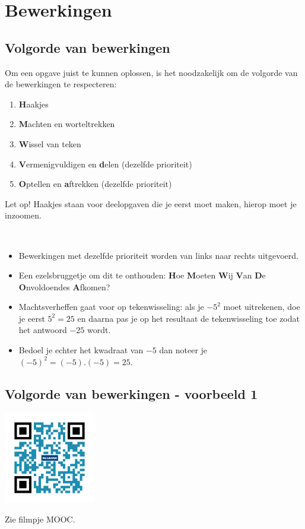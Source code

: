 \section{Bewerkingen}

\subsection{Volgorde van bewerkingen}
Om een opgave juist te kunnen oplossen, is het noodzakelijk om de volgorde van de bewerkingen te respecteren:

\begin{enumerate}
	\item \textbf{H}aakjes
	\item \textbf{M}achten en worteltrekken
	\item \textbf{W}issel van teken
	\item \textbf{V}ermenigvuldigen en \textbf{d}elen (dezelfde prioriteit)
	\item \textbf{O}ptellen en \textbf{a}ftrekken (dezelfde prioriteit)
\end{enumerate}


Let op! Haakjes staan voor deelopgaven die je eerst moet maken, hierop moet je inzoomen.


\begin{opmerking}
	\ \\
	\begin{itemize}
	\item Bewerkingen met dezelfde prioriteit worden van links naar rechts uitgevoerd.
	\item Een ezelsbruggetje om dit te onthouden: \textbf{H}oe \textbf{M}oeten \textbf{W}ij \textbf{V}an \textbf{D}e \textbf{O}nvoldoendes \textbf{A}fkomen?
	\item Machtsverheffen gaat voor op tekenwisseling: als je $-5^2$ moet uitrekenen, doe je eerst $5^2=25$ en daarna pas je op het resultaat de tekenwisseling toe zodat het antwoord $-25$ wordt.
	\item Bedoel je echter het kwadraat van $-5$ dan noteer je $(-5)^2=(-5).(-5)=25$.
\end{itemize}
\end{opmerking}

\subsection{Volgorde van bewerkingen - voorbeeld 1}
\begin{minipage}{.25\linewidth}
	\raggedright
	\includegraphics[width=4cm]{1_elem_rekenvaardigheden_A/inputs/QR_Code_VOLGORDE1_module1}
\end{minipage}
\begin{minipage}{.7\linewidth}
	Zie filmpje MOOC.
\end{minipage}

